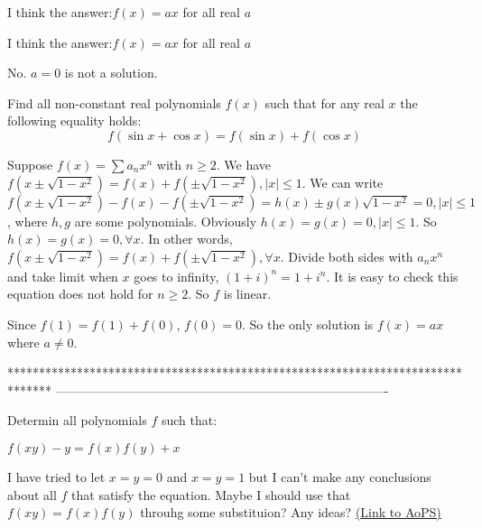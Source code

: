 \begin{solution}
	I think the answer:$f(x)=ax$ for all real $a$
\end{solution}



\begin{solution}
	\begin{tcolorbox}I think the answer:$f(x)=ax$ for all real $a$\end{tcolorbox}
No. $a=0$ is not a solution.
\end{solution}



\begin{solution}
	\begin{tcolorbox}Find all non-constant real polynomials $f (x)$ such that for any real $x$ the following equality
holds:
\[f (\sin x + \cos x) = f (\sin x) + f (\cos x)\]\end{tcolorbox}

Suppose $f(x)=\sum a_nx^n$ with $n\ge2$.
We have $f(x\pm\sqrt{1-x^2})=f(x)+f(\pm\sqrt{1-x^2}),|x|\le1$.
We can write $f(x\pm\sqrt{1-x^2})-f(x)-f(\pm\sqrt{1-x^2})=h(x)\pm g(x)\sqrt{1-x^2}=0,|x|\le1$, where $h,g$ are some polynomials.
Obviously $h(x)=g(x)=0,|x|\le1$. So $h(x)=g(x)=0,\forall x$. 
In other words, $f(x\pm\sqrt{1-x^2})=f(x)+f(\pm\sqrt{1-x^2}),\forall x$.
Divide both sides with $a_nx^n$ and take limit when $x$ goes to infinity,
$(1+i)^n=1+i^n$. 
It is easy to check this equation does not hold for $n\ge2$. So $f$ is linear.

Since $f(1)=f(1)+f(0)$, $f(0)=0$. So the only solution is $f(x)=ax$ where $a\ne0$.
\end{solution}
*******************************************************************************
-------------------------------------------------------------------------------

\begin{problem}
	Determin all polynomials $f$ such that:

$f(xy)-y=f(x)f(y)+x$

I have tried to let $x=y=0$ and $x=y=1$ but I can't make any conclusions about all $f$ that satisfy the equation.
Maybe I should use that $f(xy)=f(x)f(y)$ throuhg some substituion? Any ideas?
	\flushright \href{https://artofproblemsolving.com/community/c6h608180}{(Link to AoPS)}
\end{problem}



